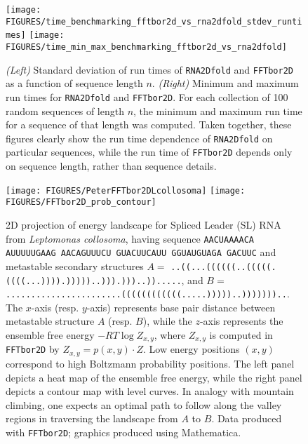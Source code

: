 \begin{figure}[!bpth]
\begin{center}
\texttt{[image: FIGURES/time\_benchmarking\_fftbor2d\_vs\_rna2dfold\_stdev\_runtimes]}
\texttt{[image: FIGURES/time\_min\_max\_benchmarking\_fftbor2d\_vs\_rna2dfold]}
\caption{\small
{\em (Left)}
Standard deviation of run times of {\tt RNA2Dfold} and {\tt FFTbor2D}
as a function of sequence length $n$.
{\em (Right)}
Minimum and maximum run times for {\tt RNA2Dfold} and {\tt FFTbor2D}.
For each collection of 100 random sequences of length $n$, the minimum
and maximum run time for a sequence of that length was computed.
Taken together, these figures clearly show the
run time dependence of {\tt RNA2Dfold} on particular sequences, while
the run time of {\tt FFTbor2D} depends only on sequence length, rather than
sequence details.
}
\end{center}
\label{fig:benchmarking3}
\end{figure}


\begin{figure}[!t]
\begin{center}
\texttt{[image: FIGURES/PeterFFTbor2DLcollosoma]}
\hskip 1cm
\texttt{[image: FIGURES/FFTbor2D\_prob\_contour]}
\caption{\small
2D projection of energy landscape for Spliced Leader (SL) RNA
from {\em Leptomonas collosoma}, having
sequence
{\tt AACUAAAACA AUUUUUGAAG AACAGUUUCU GUACUUCAUU GGUAUGUAGA GACUUC} and
metastable secondary structures  $A=$
{\tiny \tt ..((...((((((..(((((.((((...)))).)))))..))).)))..)).....}, and
$B=$ {\tiny \tt .......................((((((((((((.....)))))..)))))))..}.
The $x$-axis (resp. $y$-axis)
represents base pair distance between metastable structure $A$ (resp. $B$),
while the $z$-axis represents the ensemble free energy $-RT \log Z_{x,y}$,
where $Z_{x,y}$ is computed in {\tt FFTbor2D} by $Z_{x,y}= p(x,y) \cdot Z$.
Low energy positions $(x,y)$ correspond to high Boltzmann probability positions.
The left panel depicts a heat map of the ensemble free energy,
while the right panel depicts a contour map with level curves. In analogy
with mountain climbing, one expects an optimal path to follow along the
valley regions in traversing the landscape from $A$ to $B$. Data produced
with {\tt FFTbor2D}; graphics produced using Mathematica.
}
\label{fig:heatmapFFTbor2D}
\end{center}
\end{figure}





